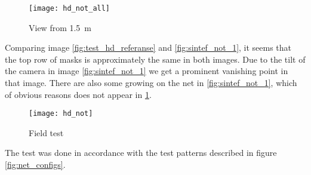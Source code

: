 \begin{figure}[htbp]
	\centering
	\texttt{[image: hd\_not\_all]}
	\caption{View from \SI{1.5}{\metre}}
	\label{fig:test_hd_referanse}
\end{figure}

Comparing image \vref{fig:test_hd_referanse} and \vref{fig:sintef_not_1}, it seems that the 
top row of masks is approximately the same in both images. Due to the tilt of the 
camera in image \ref{fig:sintef_not_1} we get a prominent vanishing point in that image. There 
are also some growing on the net in \ref{fig:sintef_not_1}, which of obvious reasons does not appear 
in \ref{fig:test_hd_referanse}.

\begin{figure}[htbp]
	\centering
	\texttt{[image: hd\_not]}
	\caption{Field test}
	\label{fig:test_hd_clip}
\end{figure}

The test was done in accordance with the test patterns described in figure \vref{fig:net_configs}. 